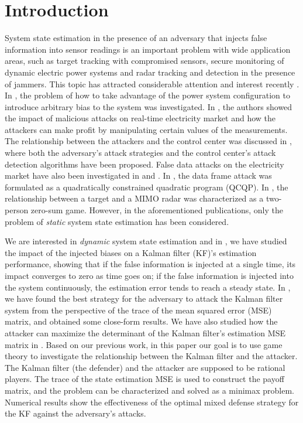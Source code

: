 \documentclass{article}
\begin{document}
\section{Introduction}
\label{sec:intro}
System state estimation in the presence of an adversary that injects false information into sensor readings is an important problem with wide application areas, such as target tracking with compromised sensors, secure monitoring of dynamic electric power systems and radar tracking and detection in the presence of jammers. This topic has attracted considerable attention and interest recently \cite{liu&etal:ccs09, jia&etal:icassp11,kosut&etal_icsgc10,jia&etal_pesgm12,Rahman&Mohsenian-Rad_globecomm12,kim&etal:jsac14,song&etal:sp12}. In \cite{liu&etal:ccs09}, the problem of how to take advantage of the power system configuration to introduce arbitrary bias to the system was investigated. In \cite{jia&etal:icassp11}, the authors showed the impact of malicious attacks on real-time electricity market and how the attackers can make profit by manipulating certain values of the measurements. The relationship between the attackers and the control center was discussed in \cite{kosut&etal_icsgc10}, where both the adversary's attack strategies and the control center's attack detection algorithms have been proposed. False data attacks on the electricity market have also been investigated in \cite{jia&etal_pesgm12} and  \cite{Rahman&Mohsenian-Rad_globecomm12}. In \cite{kim&etal:jsac14}, the data frame attack was formulated as a quadratically constrained quadratic program (QCQP). In \cite{song&etal:sp12}, the relationship between a target and a MIMO radar was characterized as a two-person zero-sum game. However, in the aforementioned publications, only the problem of {\it static} system state estimation has been considered.

 We are interested in {\it dynamic} system state estimation and in \cite{niu&huie_ssp12}, we have studied the impact of the injected biases on a Kalman filter (KF)'s estimation performance, showing that if the false information is injected at a single time, its impact  converges to zero as time goes on; if the false information is  injected into the system continuously, the estimation error tends to reach a steady state. In \cite{lu&niu:fusion14}, we have found the best strategy for the adversary to attack the Kalman filter system from the perspective of the trace of the mean squared error (MSE) matrix, and obtained  some close-form results. We have also studied how the attacker can maximize the determinant of the Kalman filter's estimation MSE matrix in  \cite{lu&niu:globalsip14}. Based on our previous work, in this paper our goal is to use game theory to investigate the relationship between the Kalman filter and the attacker.  The Kalman filter (the defender) and the attacker are supposed to be rational players. The trace of the state estimation MSE is used to construct the payoff matrix, and the problem can be characterized and solved as a minimax problem. Numerical results show the effectiveness of the optimal mixed defense strategy for the KF against the adversary's attacks.
\end{document}
